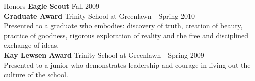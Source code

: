 \documentclass{resume} %
\begin{document}

\begin{rSection}{Honors}
\textbf{Eagle Scout} \hfill Fall 2009 \\
\textbf{Graduate Award} \hfill Trinity School at Greenlawn - Spring 2010 \\
Presented to a graduate who embodies: discovery of truth, creation of beauty, practice of goodness, rigorous exploration of reality and the free and disciplined exchange of ideas. \\
\textbf{Kay Lewsen Award} \hfill Trinity School at Greenlawn - Spring 2009 \\
Presented to a junior who demonstrates leadership and courage in living out the culture of the school. \\ 
\end{rSection}

\end{document}
